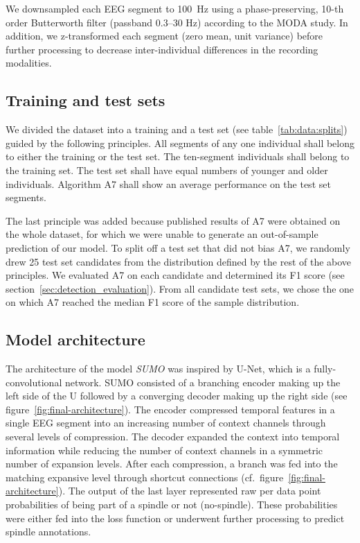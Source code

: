 \documentclass[fleqn,twocolumn,10pt]{wlscirep}
\begin{document}
We downsampled each EEG segment to 100~Hz using a phase-preserving, 10-th order Butterworth filter (passband 0.3--30 Hz) according to the MODA study.  In addition, we z-transformed each segment (zero mean, unit variance)
before further processing to decrease inter-individual differences
in the recording modalities.

\subsection{Training and test sets}
\label{sec:train-test-split}

We divided the dataset into a training
and a test set (see table~\ref{tab:data:splits}) guided by the following principles.  All segments of any one
individual shall belong to either the training or the test set.  The ten-segment
individuals shall belong to the training set.  The test set shall have equal
numbers of younger and older individuals.  Algorithm A7 shall show an average
performance on the test set segments.

The last principle was added because published results of A7 were obtained on
the whole dataset, for which we were unable to generate an out-of-sample
prediction of our model.
To split off a test set that did not bias A7, we randomly drew 25 test set
candidates from the distribution defined by the rest of the above principles.  We
evaluated A7 on each candidate and determined its F1 score (see section~\ref{sec:detection_evaluation}).  From all candidate
test sets, we chose the one on which A7 reached the median F1 score of the sample
distribution.

\subsection{Model architecture}

The architecture of the model \emph{SUMO} was inspired by U-Net\cite{Ronneberger2015}, which is a
fully-convolutional network. SUMO consisted of a branching encoder making up the left
side of the U followed by a converging decoder making up the right side (see
figure~\ref{fig:final-architecture}).
The encoder compressed temporal features in a single EEG segment into an
increasing number of context channels through several levels of compression.
The decoder expanded the context into temporal information while reducing the
number of context channels in a symmetric number of expansion levels.  After
each compression, a branch was fed into the matching expansive level through
shortcut connections (cf.~figure~\ref{fig:final-architecture}).  The output of the
last layer represented raw per data point probabilities of being part of a spindle or not (no-spindle).
These probabilities 
were either fed into the loss function or underwent further processing to
predict spindle annotations.
\end{document}
